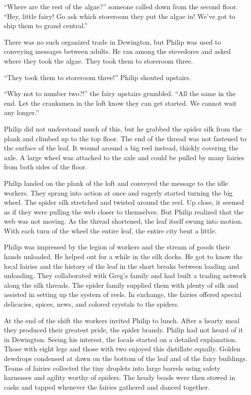\documentclass[10pt]{memoir}
\begin{document}
``Where are the rest of the algae?'' someone called down from the second floor.
``Hey, little fairy! Go ask which storeroom they put the algae in! We've got to
ship them to grand central.''

There was no such organized trade in Dewington, but Philip was used to
conveying messages between adults. He ran among the stevedores and asked where
they took the algae. They took them to storeroom three.

``They took them to storeroom three!'' Philip shouted upstairs.

``Why not to number two?!'' the fairy upstairs grumbled. ``All the same in the
end. Let the cranksmen in the loft know they can get started. We cannot wait
any longer.''

Philip did not understand much of this, but he grabbed the spider silk from the
plank and climbed up to the top floor. The end of the thread was not fastened
to the surface of the leaf. It wound around a big reel instead, thickly
covering the axle. A large wheel was attached to the axle and could be pulled
by many fairies from both sides of the floor.

Philip landed on the plank of the loft and conveyed the message to the idle
workers. They sprang into action at once and eagerly started turning the big
wheel. The spider silk stretched and twisted around the reel. Up close, it
seemed as if they were pulling the web closer to themselves. But Philip
realized that the web was not moving. As the thread shortened, the leaf itself
swung into motion. With each turn of the wheel the entire leaf, the entire city
bent a little.

Philip was impressed by the legion of workers and the stream of goods their
hands unloaded. He helped out for a while in the silk docks. He got to know the
local fairies and the history of the leaf in the short breaks between loading
and unloading. They collaborated with Greg's family and had built a trading
network along the silk threads. The spider family supplied them with plenty of
silk and assisted in setting up the system of reels. In exchange, the fairies
offered special delicacies, spices, news, and colored crystals to the spiders.

At the end of the shift the workers invited Philip to lunch. After a hearty
meal they produced their greatest pride, the spider brandy. Philip had not
heard of it in Dewington. Seeing his interest, the locals started on a detailed
explanation. Those with eight legs and those with two enjoyed this distillate
equally. Golden dewdrops condensed at dawn on the bottom of the leaf and of the
fairy buildings. Teams of fairies collected the tiny droplets into large
barrels using safety harnesses and agility worthy of spiders. The heady
beads were then stowed in casks and tapped whenever the fairies gathered and
danced together.
\end{document}

